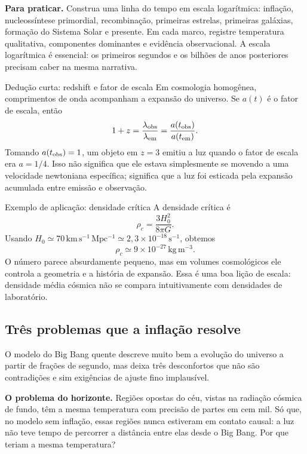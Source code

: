\documentclass[11pt,a4paper]{article}
\begin{document}
\textbf{Para praticar.} Construa uma linha do tempo em escala logarítmica: inflação, nucleossíntese primordial, recombinação, primeiras estrelas, primeiras galáxias, formação do Sistema Solar e presente. Em cada marco, registre temperatura qualitativa, componentes dominantes e evidência observacional. A escala logarítmica é essencial: os primeiros segundos e os bilhões de anos posteriores precisam caber na mesma narrativa.

\begin{lessonblock}[borderline west={2pt}{0pt}{astroGold}]{Dedução curta: redshift e fator de escala}
Em cosmologia homogênea, comprimentos de onda acompanham a expansão do universo. Se $a(t)$ é o fator de escala, então
\[
1+z=\frac{\lambda_{\rm obs}}{\lambda_{\rm em}}=\frac{a(t_{\rm obs})}{a(t_{\rm em})}.
\]
Tomando $a(t_{\rm obs})=1$, um objeto em $z=3$ emitiu a luz quando o fator de escala era $a=1/4$. Isso não significa que ele estava simplesmente se movendo a uma velocidade newtoniana específica; significa que a luz foi esticada pela expansão acumulada entre emissão e observação.
\end{lessonblock}

\begin{lessonblock}{Exemplo de aplicação: densidade crítica}
A densidade crítica é
\[
\rho_c=\frac{3H_0^2}{8\pi G}.
\]
Usando $H_0\simeq70\,\mathrm{km\,s^{-1}\,Mpc^{-1}}\simeq2{,}3\times10^{-18}\,\mathrm{s^{-1}}$, obtemos
\[
\rho_c\simeq9\times10^{-27}\,\mathrm{kg\,m^{-3}}.
\]
O número parece absurdamente pequeno, mas em volumes cosmológicos ele controla a geometria e a história de expansão. Essa é uma boa lição de escala: densidade média cósmica não se compara intuitivamente com densidades de laboratório.
\end{lessonblock}

\subsection*{Três problemas que a inflação resolve}

O modelo do Big Bang quente descreve muito bem a evolução do universo a partir de frações de segundo, mas deixa três desconfortos que não são contradições e sim exigências de ajuste fino implausível.

\textbf{O problema do horizonte.} Regiões opostas do céu, vistas na radiação cósmica de fundo, têm a mesma temperatura com precisão de partes em cem mil. Só que, no modelo sem inflação, essas regiões nunca estiveram em contato causal: a luz não teve tempo de percorrer a distância entre elas desde o Big Bang. Por que teriam a mesma temperatura?
\end{document}
